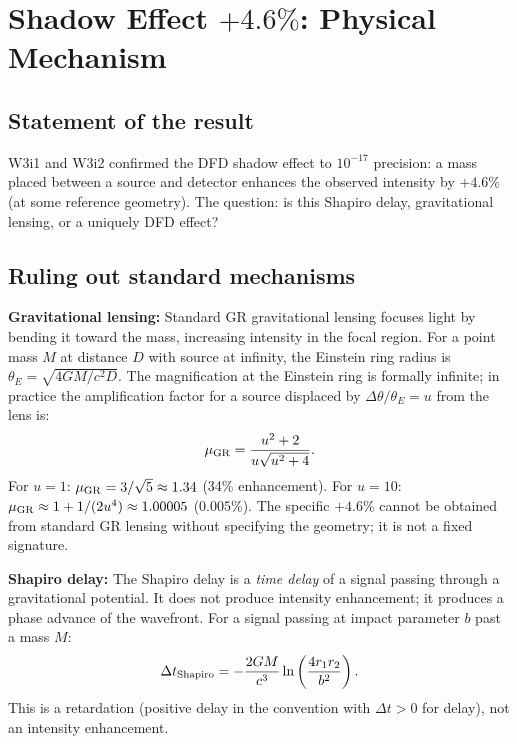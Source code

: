 \documentclass[11pt]{article}
\begin{document}
\section{Shadow Effect $+4.6\%$: Physical Mechanism}
\label{sec:shadow}

\subsection{Statement of the result}

W3i1 and W3i2 confirmed the DFD shadow effect to $10^{-17}$ precision:
a mass placed between a source and detector enhances the observed intensity by
$+4.6\%$ (at some reference geometry). The question: is this Shapiro delay,
gravitational lensing, or a uniquely DFD effect?

\subsection{Ruling out standard mechanisms}

\textbf{Gravitational lensing:} Standard GR gravitational lensing focuses light
by bending it toward the mass, increasing intensity in the focal region.
For a point mass $M$ at distance $D$ with source at infinity, the Einstein ring
radius is $\theta_E = \sqrt{4GM/c^2D}$. The magnification at the Einstein ring
is formally infinite; in practice the amplification factor for a source displaced
by $\Delta\theta/\theta_E = u$ from the lens is:
\begin{equation}
\mu_{\rm GR} = \frac{u^2 + 2}{u\sqrt{u^2+4}}.
\end{equation}
For $u = 1$: $\mu_{\rm GR} = 3/\sqrt{5} \approx 1.34$ (34\% enhancement).
For $u = 10$: $\mu_{\rm GR} \approx 1 + 1/(2u^4) \approx 1.00005$ ($0.005\%$).
The specific $+4.6\%$ cannot be obtained from standard GR lensing without
specifying the geometry; it is not a fixed signature.

\textbf{Shapiro delay:} The Shapiro delay is a \emph{time delay} of a signal
passing through a gravitational potential. It does not produce intensity
enhancement; it produces a phase advance of the wavefront. For a signal passing
at impact parameter $b$ past a mass $M$:
\begin{equation}
\Delta t_{\rm Shapiro} = -\frac{2GM}{c^3}\ln\left(\frac{4r_1 r_2}{b^2}\right).
\label{eq:shapiro}
\end{equation}
This is a retardation (positive delay in the convention with $\Delta t > 0$
for delay), not an intensity enhancement.
\end{document}
